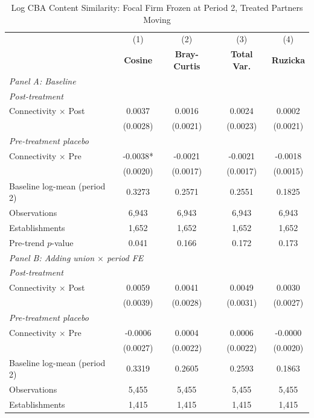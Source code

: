 \begin{table}[H]
\centering
\caption{Log CBA Content Similarity: Focal Firm Frozen at Period 2, Treated Partners Moving}
\label{tab:focal_frozen_ln_cba_similarity}
\scriptsize
\setlength{\tabcolsep}{8pt}
\begin{tabular}{lcccc}
\hline\hline
 & (1) & (2) & (3) & (4) \\
 & \textbf{Cosine} & \textbf{Bray-Curtis} & \textbf{Total Var.} & \textbf{Ruzicka} \\
\hline
\multicolumn{5}{l}{\textit{Panel A: Baseline}} \\
\multicolumn{5}{l}{\textit{Post-treatment}} \\
Connectivity $\times$ Post & 0.0037 & 0.0016 & 0.0024 & 0.0002 \\
 & (0.0028) & (0.0021) & (0.0023) & (0.0021) \\
\multicolumn{5}{l}{\textit{Pre-treatment placebo}} \\
Connectivity $\times$ Pre & -0.0038* & -0.0021 & -0.0021 & -0.0018 \\
 & (0.0020) & (0.0017) & (0.0017) & (0.0015) \\
\hline
Baseline log-mean (period 2) & 0.3273 & 0.2571 & 0.2551 & 0.1825 \\
Observations &        6,943 &        6,943 &        6,943 &        6,943 \\
Establishments &        1,652 &        1,652 &        1,652 &        1,652 \\
Pre-trend $p$-value & 0.041 & 0.166 & 0.172 & 0.173 \\
\hline
\multicolumn{5}{l}{\textit{Panel B: Adding union $\times$ period FE}} \\
\multicolumn{5}{l}{\textit{Post-treatment}} \\
Connectivity $\times$ Post & 0.0059 & 0.0041 & 0.0049 & 0.0030 \\
 & (0.0039) & (0.0028) & (0.0031) & (0.0027) \\
\multicolumn{5}{l}{\textit{Pre-treatment placebo}} \\
Connectivity $\times$ Pre & -0.0006 & 0.0004 & 0.0006 & -0.0000 \\
 & (0.0027) & (0.0022) & (0.0022) & (0.0020) \\
\hline
Baseline log-mean (period 2) & 0.3319 & 0.2605 & 0.2593 & 0.1863 \\
Observations &        5,455 &        5,455 &        5,455 &        5,455 \\
Establishments &        1,415 &        1,415 &        1,415 &        1,415 \\

\end{tabular}
\end{table}
